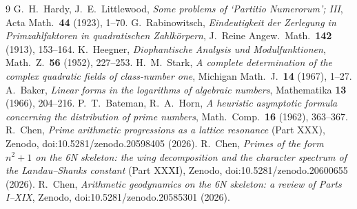 \documentclass[11pt]{article}
\theoremstyle{definition}
\begin{document}
\begin{thebibliography}{9}
 G.~H.~Hardy, J.~E.~Littlewood, \emph{Some problems of `Partitio Numerorum'; III}, Acta Math.\ \textbf{44} (1923), 1--70.
 G.~Rabinowitsch, \emph{Eindeutigkeit der Zerlegung in Primzahlfaktoren in quadratischen Zahlk\"orpern}, J.\ Reine Angew.\ Math.\ \textbf{142} (1913), 153--164.
 K.~Heegner, \emph{Diophantische Analysis und Modulfunktionen}, Math.\ Z.\ \textbf{56} (1952), 227--253.
 H.~M.~Stark, \emph{A complete determination of the complex quadratic fields of class-number one}, Michigan Math.\ J.\ \textbf{14} (1967), 1--27.
 A.~Baker, \emph{Linear forms in the logarithms of algebraic numbers}, Mathematika \textbf{13} (1966), 204--216.
 P.~T.~Bateman, R.~A.~Horn, \emph{A heuristic asymptotic formula concerning the distribution of prime numbers}, Math.\ Comp.\ \textbf{16} (1962), 363--367.
 R.~Chen, \emph{Prime arithmetic progressions as a lattice resonance} (Part XXX), Zenodo, doi:10.5281/zenodo.20598405 (2026).
 R.~Chen, \emph{Primes of the form $n^2+1$ on the 6N skeleton: the wing decomposition and the character spectrum of the Landau--Shanks constant} (Part XXXI), Zenodo, doi:10.5281/zenodo.20600655 (2026).
 R.~Chen, \emph{Arithmetic geodynamics on the 6N skeleton: a review of Parts I--XIX}, Zenodo, doi:10.5281/zenodo.20585301 (2026).
\end{thebibliography}
\end{document}

